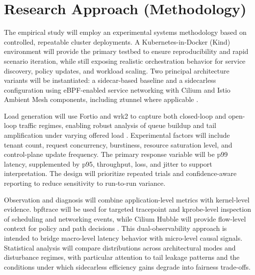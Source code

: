 \section{Research Approach (Methodology)}
The empirical study will employ an experimental systems methodology based on controlled, repeatable cluster deployments. A Kubernetes-in-Docker (Kind) environment will provide the primary testbed to ensure reproducibility and rapid scenario iteration, while still exposing realistic orchestration behavior for service discovery, policy updates, and workload scaling. Two principal architecture variants will be instantiated: a sidecar-based baseline and a sidecarless configuration using eBPF-enabled service networking with Cilium and Istio Ambient Mesh components, including ztunnel where applicable \cite{kindProject,istioAmbient,ciliumArchitecture}.

Load generation will use Fortio and wrk2 to capture both closed-loop and open-loop traffic regimes, enabling robust analysis of queue buildup and tail amplification under varying offered load \cite{fortio,wrk2}. Experimental factors will include tenant count, request concurrency, burstiness, resource saturation level, and control-plane update frequency. The primary response variable will be p99 latency, supplemented by p95, throughput, loss, and jitter to support interpretation. The design will prioritize repeated trials and confidence-aware reporting to reduce sensitivity to run-to-run variance.

Observation and diagnosis will combine application-level metrics with kernel-level evidence. bpftrace will be used for targeted tracepoint and kprobe-level inspection of scheduling and networking events, while Cilium Hubble will provide flow-level context for policy and path decisions \cite{bpftrace,ciliumHubble}. This dual-observability approach is intended to bridge macro-level latency behavior with micro-level causal signals. Statistical analysis will compare distributions across architectural modes and disturbance regimes, with particular attention to tail leakage patterns and the conditions under which sidecarless efficiency gains degrade into fairness trade-offs.
